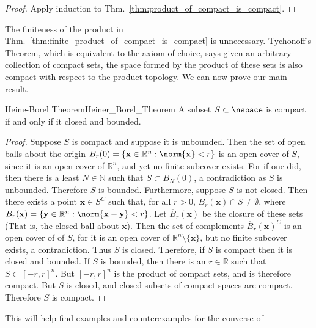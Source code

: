 \documentclass{article}                                                        %
\begin{document}
        \begin{proof}
            Apply induction to Thm.~\ref{thm:product_of_compact_is_compact}.
        \end{proof}
        The finiteness of the product in
        Thm.~\ref{thm:finite_product_of_compact_is_compact} is unnecessary.
        Tychonoff's Theorem, which is equivalent to the axiom of choice, says
        given an arbitrary collection of compact sets, the space formed by the
        product of these sets is also compact with respect to the product
        topology. We can now prove our main result.
        \begin{ftheorem}{Heine-Borel Theorem}{Heiner_Borel_Theorem}
            A subset $S\subset\nspace$ is compact if
            and only if it closed and bounded.
        \end{ftheorem}
        \begin{proof}
            Suppose $S$ is compact and suppose it is unbounded. Then the
            set of open balls about the origin
            $B_{r}(0)=\{\mathbf{x}\in\mathbb{R}^{n}:\norm{\mathbf{x}}<r\}$
            is an open cover of $S$, since it is an open cover of
            $\mathbb{R}^{n}$, and yet no finite subcover exists. For if
            one did, then there is a least $N\in\mathbb{N}$ such that
            $S\subset{B_{N}(0)}$, a contradiction as $S$ is unbounded.
            Therefore $S$ is bounded. Furthermore, suppose $S$ is
            not closed. Then there exists a point $\mathbf{x}\in{S^{C}}$
            such that, for all $r>0$,
            $B_{r}(\mathbf{x})\cap{S}\ne\emptyset$, where
            $B_{r}(\mathbf{x})=\{\mathbf{y}\in\mathbb{R}^{n}:%
             \norm{\mathbf{x}-\mathbf{y}}<r\}$.
            Let $\overline{B}_{r}(\mathbf{x})$ be the closure of these sets
            (That is, the closed ball about $\mathbf{x}$). Then the set of
            complements $\overline{B}_{r}(\mathbf{x})^{C}$ is an open cover
            of of $S$, for it is an open cover of
            $\mathbb{R}^{n}\setminus\{\mathbf{x}\}$, but no finite subcover
            exists, a contradiction. Thus $S$ is closed. Therefore, if $S$
            is compact then it is closed and bounded. If $S$ is bounded,
            then there is an $r\in\mathbb{R}$ such that
            $S\subset[-r,r]^{n}$. But $[-r,r]^{n}$ is the product of compact
            sets, and is therefore compact. But $S$ is closed, and closed
            subsets of compact spaces are compact. Therefore $S$ is compact.
        \end{proof}
        This will help find examples and counterexamples for the converse of
\end{document}
